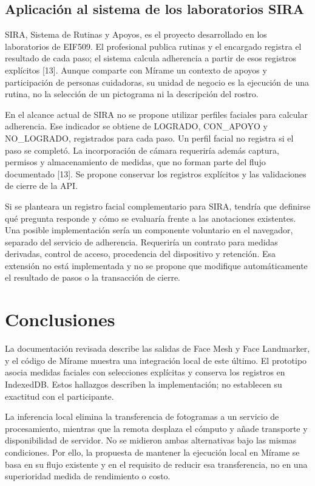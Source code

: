 \documentclass[conference,letterpaper]{IEEEtran}
\begin{document}
\subsection{Aplicación al sistema de los laboratorios SIRA}
SIRA, Sistema de Rutinas y Apoyos, es el proyecto desarrollado en los laboratorios de EIF509. El profesional publica rutinas y el encargado registra el resultado de cada paso; el sistema calcula adherencia a partir de esos registros explícitos [13]. Aunque comparte con Mírame un contexto de apoyos y participación de personas cuidadoras, su unidad de negocio es la ejecución de una rutina, no la selección de un pictograma ni la descripción del rostro.

En el alcance actual de SIRA no se propone utilizar perfiles faciales para calcular adherencia. Ese indicador se obtiene de LOGRADO, CON\_APOYO y NO\_LOGRADO, registrados para cada paso. Un perfil facial no registra si el paso se completó. La incorporación de cámara requeriría además captura, permisos y almacenamiento de medidas, que no forman parte del flujo documentado [13]. Se propone conservar los registros explícitos y las validaciones de cierre de la API.

Si se planteara un registro facial complementario para SIRA, tendría que definirse qué pregunta responde y cómo se evaluaría frente a las anotaciones existentes. Una posible implementación sería un componente voluntario en el navegador, separado del servicio de adherencia. Requeriría un contrato para medidas derivadas, control de acceso, procedencia del dispositivo y retención. Esa extensión no está implementada y no se propone que modifique automáticamente el resultado de pasos o la transacción de cierre.


\section{Conclusiones}
La documentación revisada describe las salidas de Face Mesh y Face Landmarker, y el código de Mírame muestra una integración local de este último. El prototipo asocia medidas faciales con selecciones explícitas y conserva los registros en IndexedDB. Estos hallazgos describen la implementación; no establecen su exactitud con el participante.

La inferencia local elimina la transferencia de fotogramas a un servicio de procesamiento, mientras que la remota desplaza el cómputo y añade transporte y disponibilidad de servidor. No se midieron ambas alternativas bajo las mismas condiciones. Por ello, la propuesta de mantener la ejecución local en Mírame se basa en su flujo existente y en el requisito de reducir esa transferencia, no en una superioridad medida de rendimiento o costo.
\end{document}
